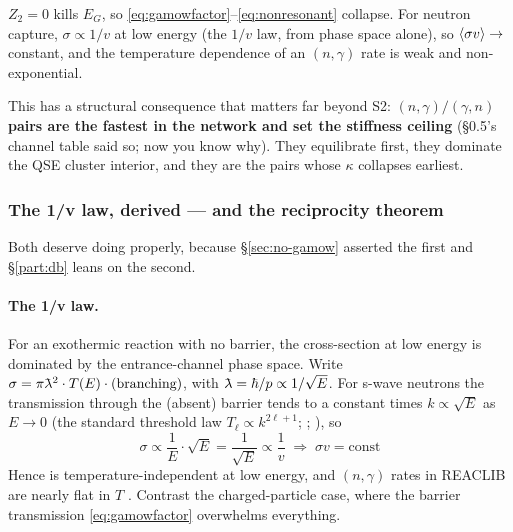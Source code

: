 $Z_2 = 0$ kills $E_G$, so \eqref{eq:gamowfactor}--\eqref{eq:nonresonant}
collapse. For neutron capture, $\sigma \propto 1/v$ at low energy (the $1/v$
law, from phase space alone), so $\langle\sigma v\rangle \to$ constant, and the temperature
dependence of an $(n,\gamma)$ rate is weak and non-exponential.

This has a structural consequence that matters far beyond S2:
\textbf{$(n,\gamma)/(\gamma,n)$ pairs are the fastest in the network and set the
stiffness ceiling} (\S0.5's channel table said so; now you know why). They
equilibrate first, they dominate the QSE cluster interior, and they are the
pairs whose $\kappa$ collapses earliest.

\subsubsection{The 1/v law, derived --- and the reciprocity theorem}
\label{sec:reciprocity}

Both deserve doing properly, because \S\ref{sec:no-gamow} asserted the first and
\S\ref{part:db} leans on the second.

\paragraph{The 1/v law.} For an exothermic reaction with no barrier, the
cross-section at low energy is dominated by the entrance-channel phase space.
Write $\sigma = \pi\lbar^2\cdot T(E)\cdot(\text{branching})$, with
$\lbar = \hbar/p \propto 1/\sqrt E$. For s-wave neutrons the transmission
through the (absent) barrier tends to a constant times $k \propto \sqrt E$ as
$E \to 0$ (the standard threshold law $T_\ell \propto k^{2\ell+1}$;
\citealp{wigner1948}; \citealp{blatt1952}), so
%
\begin{equation*}
\sigma \propto \frac{1}{E}\cdot\sqrt{E} = \frac{1}{\sqrt E} \propto \frac{1}{v}
\;\Longrightarrow\; \sigma v = \text{const}
\end{equation*}
%
Hence \sigv{} is temperature-independent at low energy, and $(n,\gamma)$ rates
in REACLIB are nearly flat in $T$ \citep[Table~1: $a_6 = \ell$ for $n$-induced
non-resonant]{cyburt2010}. Contrast the charged-particle case, where the barrier
transmission \eqref{eq:gamowfactor} overwhelms everything.

